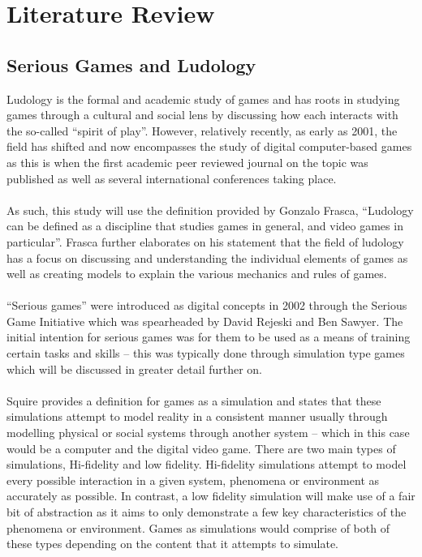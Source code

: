 \documentclass[conference]{IEEEtran}
\begin{document}
\section{Literature Review}
\subsection{Serious Games and Ludology}
Ludology is the formal and academic study of games and has roots in studying games through a cultural and social lens by discussing how each interacts with the so-called “spirit of play”\cite{Huizinga1949}. However, relatively recently, as early as 2001, the field has shifted and now encompasses the study of digital computer-based games as this is when the first academic peer reviewed journal on the topic was published as well as several international conferences taking place\cite{Frasca2013}. 
\\\\
As such, this study will use the definition provided by Gonzalo Frasca, “Ludology can be defined as a discipline that studies games in general, and video games in particular”\cite{Frasca2013}. Frasca\cite{Frasca2013} further elaborates on his statement that the field of ludology has a focus on discussing and understanding the individual elements of games as well as creating models to explain the various mechanics and rules of games. 
\\\\
“Serious games” were introduced as digital concepts in 2002 through the Serious Game Initiative which was spearheaded by David Rejeski and Ben Sawyer\cite{DeGloria2014}. The initial intention for serious games was for them to be used as a means of training certain tasks and skills\cite{DeGloria2014} – this was typically done through simulation type games which will be discussed in greater detail further on.
\\\\
Squire\cite{Squire2003} provides a definition for games as a simulation and states that these simulations attempt to model reality in a consistent manner usually through modelling physical or social systems through another system – which in this case would be a computer and the digital video game. There are two main types of simulations, Hi-fidelity and low fidelity. Hi-fidelity simulations attempt to model every possible interaction in a given system, phenomena or environment as accurately as possible\cite{Squire2003}. In contrast, a low fidelity simulation will make use of a fair bit of abstraction as it aims to only demonstrate a few key characteristics of the phenomena or environment\cite{Squire2003}. Games as simulations would comprise of both of these types depending on the content that it attempts to simulate.
\end{document}
